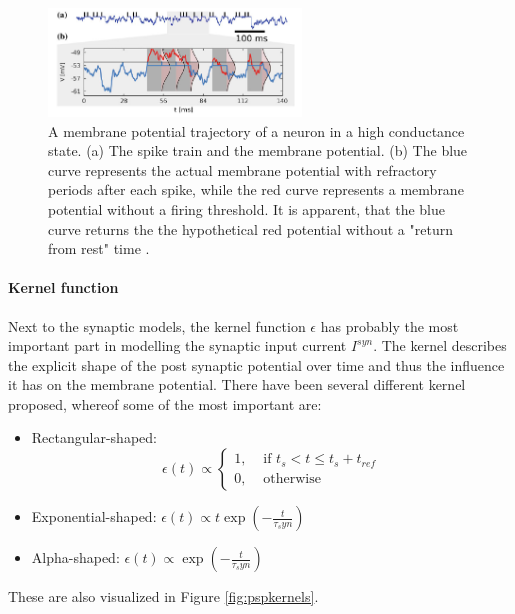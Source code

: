 \begin{figure}
	\centering
    	\includegraphics[width=0.6\textwidth]{imgs/hcs.png} 
    \caption{A membrane potential trajectory of a neuron in a high conductance state. (a) The spike train and the membrane potential. (b) The blue curve represents the actual membrane potential with refractory periods after each spike, while the red curve represents a membrane potential without a firing threshold. It is apparent, that the blue curve returns the the hypothetical red potential without a "return from rest" time  \cite{Petrovici2016}. }
	\label{fig:hcs}
\end{figure}


\paragraph{Kernel function} \label{c:pspkernel}

Next to the synaptic models, the kernel function $\epsilon$ has probably the most important part in modelling the synaptic input current $I^{syn}$. 
The kernel describes the explicit shape of the post synaptic potential over time and thus the influence it has on the membrane potential.
There have been several different kernel proposed, whereof some of the most important are:
\begin{itemize}
\item Rectangular-shaped: \[\epsilon(t) \propto  \begin{cases} 1, & \text{ if } t_{s} < t \le t_{s} + t_{ref} \\ 0, & \text{ otherwise } \end{cases} \]
\item Exponential-shaped: $\epsilon(t) \propto t \exp(- \frac{t}{\tau_syn})$
\item Alpha-shaped: $\epsilon(t) \propto \exp(- \frac{t}{\tau_syn})$
\end{itemize}

These are also visualized in Figure \ref{fig:pspkernels}.

